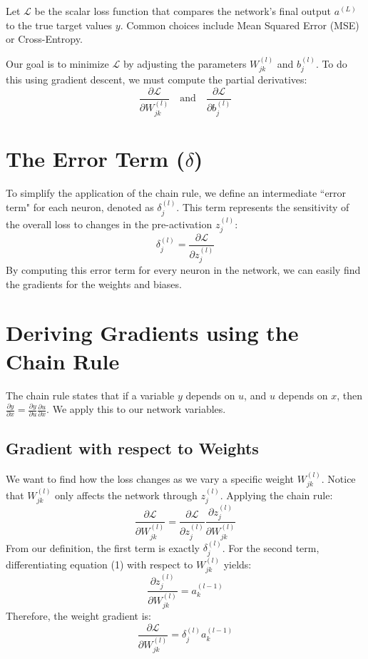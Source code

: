 \documentclass[11pt, a4paper]{article}
\begin{document}
Let $\mathcal{L}$ be the scalar loss function that compares the network's final output $a^{(L)}$ to the true target values $y$. Common choices include Mean Squared Error (MSE) or Cross-Entropy. 

Our goal is to minimize $\mathcal{L}$ by adjusting the parameters $W_{jk}^{(l)}$ and $b_j^{(l)}$. To do this using gradient descent, we must compute the partial derivatives:
\begin{equation}
    \frac{\partial \mathcal{L}}{\partial W_{jk}^{(l)}} \quad \text{and} \quad \frac{\partial \mathcal{L}}{\partial b_j^{(l)}}
\end{equation}

\section{The Error Term ($\delta$)}

To simplify the application of the chain rule, we define an intermediate ``error term" for each neuron, denoted as $\delta_j^{(l)}$. This term represents the sensitivity of the overall loss to changes in the pre-activation $z_j^{(l)}$:
\begin{equation}
    \delta_j^{(l)} = \frac{\partial \mathcal{L}}{\partial z_j^{(l)}}
\end{equation}
By computing this error term for every neuron in the network, we can easily find the gradients for the weights and biases.

\section{Deriving Gradients using the Chain Rule}

The chain rule states that if a variable $y$ depends on $u$, and $u$ depends on $x$, then $\frac{\partial y}{\partial x} = \frac{\partial y}{\partial u} \frac{\partial u}{\partial x}$. We apply this to our network variables.

\subsection{Gradient with respect to Weights}
We want to find how the loss changes as we vary a specific weight $W_{jk}^{(l)}$. Notice that $W_{jk}^{(l)}$ only affects the network through $z_j^{(l)}$. Applying the chain rule:
\begin{equation}
    \frac{\partial \mathcal{L}}{\partial W_{jk}^{(l)}} = \frac{\partial \mathcal{L}}{\partial z_j^{(l)}} \frac{\partial z_j^{(l)}}{\partial W_{jk}^{(l)}}
\end{equation}
From our definition, the first term is exactly $\delta_j^{(l)}$. For the second term, differentiating equation (1) with respect to $W_{jk}^{(l)}$ yields:
\begin{equation}
    \frac{\partial z_j^{(l)}}{\partial W_{jk}^{(l)}} = a_k^{(l-1)}
\end{equation}
Therefore, the weight gradient is:
\begin{equation}
    \frac{\partial \mathcal{L}}{\partial W_{jk}^{(l)}} = \delta_j^{(l)} a_k^{(l-1)}
\end{equation}
\end{document}
